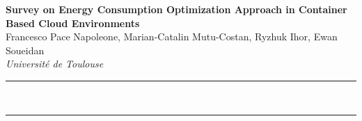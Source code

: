 \documentclass[a4paper,12pt]{article}
\renewenvironment{abstract}
 {\par\noindent\textbf{\abstractname}\ \ignorespaces \\}
 {\par\noindent\medskip}
\begin{document}
\pagestyle{fancy}
\thispagestyle{empty}
\fancyhead[L]{}
\renewcommand*{\thefootnote}{\fnsymbol{footnote}}
\begin{center}
\Large{\textbf{Survey on Energy Consumption Optimization Approach in Container Based Cloud Environments}}
\vspace{0.4cm}
\normalsize
\\ Francesco Pace Napoleone, Marian-Catalin Mutu-Costan, Ryzhuk Ihor, Ewan Soueidan \\
\vspace{0.1cm}
\textit{Université de Toulouse}
\medskip
\normalsize
\end{center}
{\color{gray}\hrule}
\vspace{0.4cm}
\begin{abstract}

\end{abstract}
{\color{gray}\hrule}
\medskip






\end{document}
